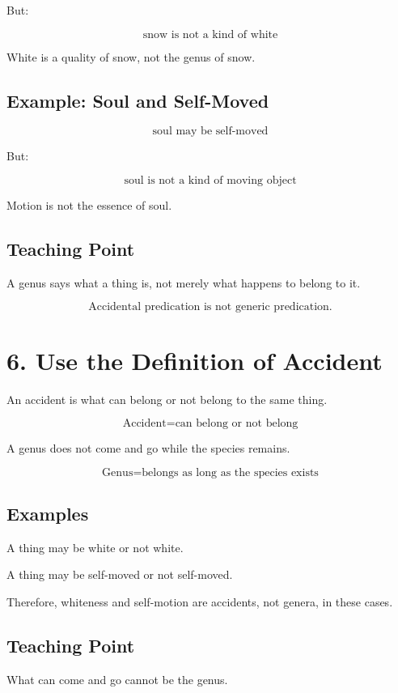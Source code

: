 \documentclass[12pt]{article}
\begin{document}
But:

\[
\text{snow is not a kind of white}
\]

White is a quality of snow, not the genus of snow.

\subsection*{Example: Soul and Self-Moved}

\[
\text{soul may be self-moved}
\]

But:

\[
\text{soul is not a kind of moving object}
\]

Motion is not the essence of soul.

\subsection*{Teaching Point}

A genus says what a thing is, not merely what happens to belong to it.

\[
\boxed{
\text{Accidental predication is not generic predication.}
}
\]

\section*{6. Use the Definition of Accident}

An accident is what can belong or not belong to the same thing.

\[
\text{Accident} = \text{can belong or not belong}
\]

A genus does not come and go while the species remains.

\[
\text{Genus} = \text{belongs as long as the species exists}
\]

\subsection*{Examples}

A thing may be white or not white.

A thing may be self-moved or not self-moved.

Therefore, whiteness and self-motion are accidents, not genera, in these cases.

\subsection*{Teaching Point}

What can come and go cannot be the genus.
\end{document}
